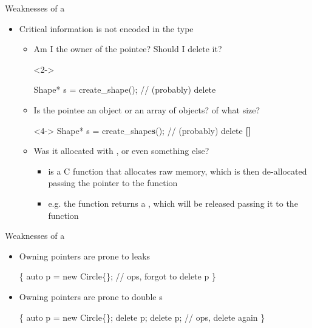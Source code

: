 \begin{frame}[fragile]{Weaknesses of a }

  \begin{itemize}
  \item<1-> Critical information is not encoded in the type
    \begin{itemize}
    \item<2-> Am I the owner of the pointee? Should I delete it?
      \begin{codeblock}<2->{
Shape* s = create_shape();               // (probably) delete

}\end{codeblock}

    \item<4-> Is the pointee an object or an array of objects? of what size?
      \begin{codeblock}<4->{
Shape* s = create_shape\textbf{s}();               // (probably) delete \textbf{[]}}\end{codeblock}

    \item<5-> Was it allocated with ,  or even something
      else?
      \begin{itemize}
      \item {} is a C function that allocates raw memory, which is
        then de-allocated passing the pointer to the function 
      \item e.g. the  function returns a , which will be
        released passing it to the  function
      \end{itemize}

    \end{itemize}
  \end{itemize}
\end{frame}

\begin{frame}[fragile]{Weaknesses of a  \insertcontinuationtext}

  \begin{itemize}
  \item Owning pointers are prone to leaks
    \begin{codeblock}
\{
  auto p = new Circle\{\ddd\};
  \ddd
  // ops, forgot to delete p
\}\end{codeblock}

  \item<2-> Owning pointers are prone to double s
    \begin{codeblock}
\{
  auto p = new Circle\{\ddd\};
  \ddd
  delete p;
  \ddd
  delete p; // ops, delete again
\}\end{codeblock}

  \end{itemize}
\end{frame}

